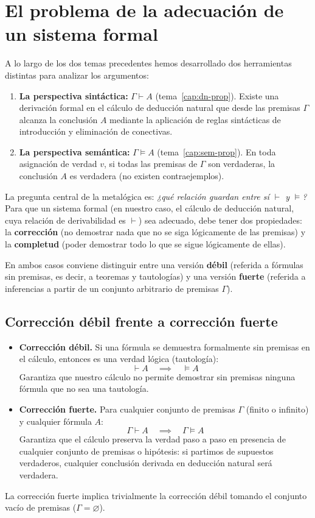 \section{El problema de la adecuación de un sistema formal}

A lo largo de los dos temas precedentes hemos desarrollado dos herramientas distintas para analizar los argumentos:
\begin{enumerate}
    \item \textbf{La perspectiva sintáctica:}
      $\Gamma \vdash A$  (tema~\ref{cap:dn-prop}). Existe una derivación formal en el cálculo de
      deducción natural que desde las premisas $\Gamma$ alcanza la
      conclusión $A$ mediante la aplicación de reglas sintácticas de
      introducción y eliminación de conectivas. 
    \item \textbf{La perspectiva semántica:} $\Gamma \models A$ (tema~\ref{cap:sem-prop}). En toda asignación de verdad $v$, si todas las premisas de $\Gamma$ son verdaderas, la conclusión $A$ es verdadera (no existen contraejemplos).
\end{enumerate}

La pregunta central de la metalógica es: \emph{¿qué relación
  guardan entre sí $\vdash$ y $\models$?} Para que un sistema formal (en nuestro caso, el cálculo de deducción natural, cuya relación de derivabilidad es $\vdash$)
sea adecuado, debe tener dos propiedades: la
\textbf{corrección} (no demostrar nada que no se siga lógicamente de las premisas) y la \textbf{completud} (poder demostrar todo lo que se sigue lógicamente de ellas).

En ambos casos conviene distinguir entre una versión \textbf{débil} (referida a fórmulas sin premisas, es decir, a teoremas y tautologías) y una versión \textbf{fuerte} (referida a inferencias a partir de un conjunto arbitrario de premisas $\Gamma$).

\subsection{Corrección débil frente a corrección fuerte}
\begin{itemize}
    \item \textbf{Corrección débil.} Si una fórmula se demuestra formalmente sin premisas en el cálculo, entonces es una verdad lógica (tautología):
    \[
    \vdash A \quad\implies\quad \models A
    \]
    Garantiza que nuestro cálculo no permite demostrar sin premisas ninguna fórmula que no sea una tautología.
    
    \item \textbf{Corrección fuerte.} Para cualquier conjunto de premisas $\Gamma$ (finito o infinito) y cualquier fórmula $A$:
    \[
    \Gamma \vdash A\quad \implies\quad \Gamma \models A
    \]
    Garantiza que el cálculo preserva la verdad paso a paso en presencia de cualquier conjunto de premisas o hipótesis: si partimos de supuestos verdaderos, cualquier conclusión derivada en deducción natural será verdadera.
\end{itemize}
La corrección fuerte implica trivialmente la corrección débil tomando
el conjunto vacío de premisas ($\Gamma = \varnothing$).

